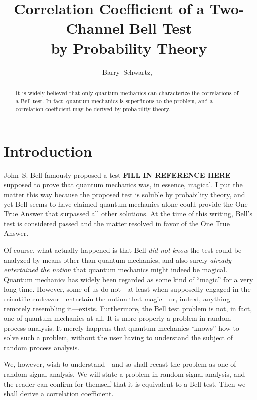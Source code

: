 \documentclass[9pt,technote]{IEEEtran}
\begin{document}
\title{Correlation Coefficient of a Two-Channel Bell Test\\by
  Probability Theory}
\author{Barry~Schwartz,~}

\maketitle

\begin{abstract}
  It is widely believed that only quantum mechanics can characterize
  the correlations of a Bell test. In fact, quantum mechanics is
  superfluous to the problem, and a correlation coefficient may be
  derived by probability theory.
\end{abstract}

\section{Introduction}

John~S. Bell famously proposed a test {\bf{FILL IN REFERENCE HERE}}
supposed to prove that quantum mechanics was, in essence, magical. I
put the matter this way because the proposed test is soluble by
probability theory, and yet Bell seems to have claimed quantum
mechanics alone could provide the One True Answer that surpassed all
other solutions. At the time of this writing, Bell's test is
considered passed and the matter resolved in favor of the One True
Answer.

Of course, what actually happened is that Bell {\em{did not know}} the
test could be analyzed by means other than quantum mechanics, and also
surely {\em{already entertained the notion}} that quantum mechanics
might indeed be magical. Quantum mechanics has widely been regarded as
some kind of ``magic'' for a very long time. However, some of us do
not---at least when supposedly engaged in the scientific
endeavor---entertain the notion that magic---or, indeed, anything
remotely resembling it---exists. Furthermore, the Bell test problem is
not, in fact, one of quantum mechanics at all. It is more properly a
problem in random process analysis. It merely happens that quantum
mechanics ``knows'' how to solve such a problem, without the user
having to understand the subject of random process analysis.

We, however, wish to understand---and so shall recast the problem as
one of random signal analysis. We will state a problem in random
signal analysis, and the reader can confirm for themself that it is
equivalent to a Bell test. Then we shall derive a correlation
coefficient.
\end{document}
